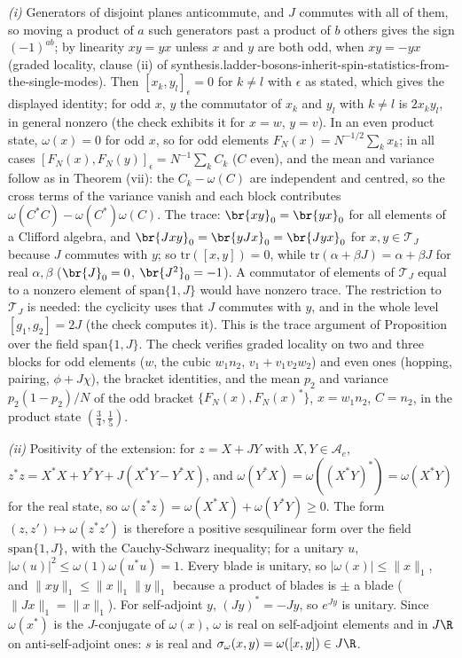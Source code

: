\emph{(i)} Generators of disjoint planes anticommute, and $J$ commutes with all of them, so moving a product of $a$ such generators past a product of $b$ others gives the sign $(-1)^{ab}$; by linearity $xy = yx$ unless $x$ and $y$ are both odd, when $xy = -yx$ (graded locality, clause (ii) of synthesis.ladder-bosons-inherit-spin-statistics-from-the-single-modes). Then $[x_{k}, y_{l}]_{\epsilon} = 0$ for $k \ne l$ with $\epsilon$ as stated, which gives the displayed identity; for odd $x$, $y$ the commutator of $x_{k}$ and $y_{l}$ with $k \ne l$ is $2x_{k}y_{l}$, in general nonzero (the check exhibits it for $x = w$, $y = v$). In an even product state, $\omega(x) = 0$ for odd $x$, so for odd elements $F_{N}(x) = N^{-1/2}\sum_{k}x_{k}$; in all cases $[F_{N}(x), F_{N}(y)]_{\epsilon} = N^{-1}\sum_{k}C_{k}$ ($C$ even), and the mean and variance follow as in Theorem (vii): the $C_{k} - \omega(C)$ are independent and centred, so the cross terms of the variance vanish and each block contributes $\omega(C^{*}C) - \omega(C^{*})\omega(C)$. The trace: $\br{xy}_{0} = \br{yx}_{0}$ for all elements of a Clifford algebra, and $\br{Jxy}_{0} = \br{yJx}_{0} = \br{Jyx}_{0}$ for $x, y \in \mathcal{T}_{J}$ because $J$ commutes with $y$; so $\mathrm{tr}([x, y]) = 0$, while $\mathrm{tr}(\alpha + \beta J) = \alpha + \beta J$ for real $\alpha, \beta$ ($\br{J}_{0} = 0$, $\br{J^{2}}_{0} = -1$). A commutator of elements of $\mathcal{T}_{J}$ equal to a nonzero element of $\mathrm{span}\{1, J\}$ would have nonzero trace. The restriction to $\mathcal{T}_{J}$ is needed: the cyclicity uses that $J$ commutes with $y$, and in the whole level $[g_{1}, g_{2}] = 2J$ (the check computes it). This is the trace argument of Proposition  over the field $\mathrm{span}\{1, J\}$. The check verifies graded locality on two and three blocks for odd elements ($w$, the cubic $w_{1}n_{2}$, $v_{1} + v_{1}v_{2}w_{2}$) and even ones (hopping, pairing, $\phi + J\chi$), the bracket identities, and the mean $p_{2}$ and variance $p_{2}(1 - p_{2})/N$ of the odd bracket $\{F_{N}(x), F_{N}(x)^{*}\}$, $x = w_{1}n_{2}$, $C = n_{2}$, in the product state $(\tfrac34, \tfrac15)$.

\emph{(ii)} Positivity of the extension: for $z = X + JY$ with $X, Y \in \mathcal{A}_{e}$, $z^{*}z = X^{*}X + Y^{*}Y + J(X^{*}Y - Y^{*}X)$, and $\omega(Y^{*}X) = \omega((X^{*}Y)^{*}) = \omega(X^{*}Y)$ for the real state, so $\omega(z^{*}z) = \omega(X^{*}X) + \omega(Y^{*}Y) \ge 0$. The form $(z, z') \mapsto \omega(z^{*}z')$ is therefore a positive sesquilinear form over the field $\mathrm{span}\{1, J\}$, with the Cauchy-Schwarz inequality; for a unitary $u$, $|\omega(u)|^{2} \le \omega(1)\omega(u^{*}u) = 1$. Every blade is unitary, so $|\omega(x)| \le \|x\|_{1}$, and $\|xy\|_{1} \le \|x\|_{1}\|y\|_{1}$ because a product of blades is $\pm$ a blade ($\|Jx\|_{1} = \|x\|_{1}$). For self-adjoint $y$, $(Jy)^{*} = -Jy$, so $e^{Jy}$ is unitary. Since $\omega(x^{*})$ is the $J$-conjugate of $\omega(x)$, $\omega$ is real on self-adjoint elements and in $J\R$ on anti-self-adjoint ones: $s$ is real and $\sigma_{\omega}(x, y) = \omega([x, y]) \in J\R$.

